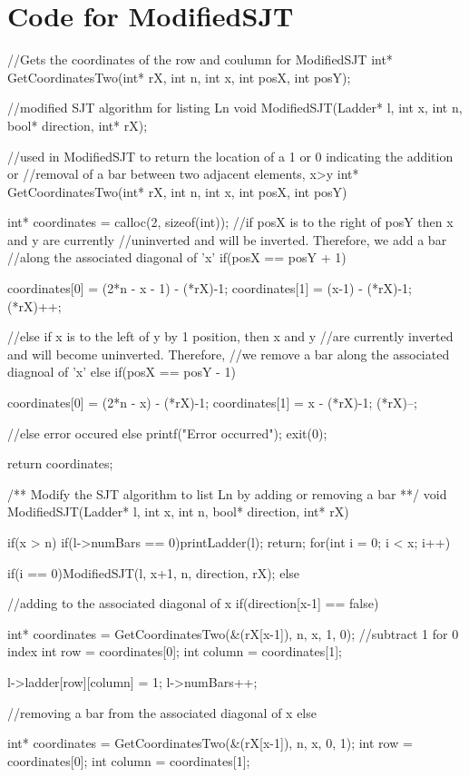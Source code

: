 \section{Code for {\sc ModifiedSJT}}

\begin{singlespace}
\begin{footnotesize}
\begin{code}
//Gets the coordinates of the row and coulumn for ModifiedSJT
int* GetCoordinatesTwo(int* rX, int n, int x, int posX, int posY);


//modified SJT algorithm for listing Ln
void ModifiedSJT(Ladder* l, int x, int n, bool* direction, int* rX);

//used in ModifiedSJT to return the location of a 1 or 0 indicating the addition or 
//removal of a bar between two adjacent elements, x>y
int* GetCoordinatesTwo(int* rX, int n, int x, int posX, int posY)
{
	int* coordinates = calloc(2, sizeof(int));
	//if posX is to the right of posY then x and y are currently 
	//uninverted and will be inverted. Therefore, we add a bar 
	//along the associated diagonal of 'x'
	if(posX == posY + 1)
	{
		coordinates[0] = (2*n - x - 1) - (*rX)-1;
		coordinates[1] = (x-1) - (*rX)-1;
		(*rX)++;

	}
	//else if x is to the left of y by 1 position, then x and y 
	//are currently inverted and will become uninverted. Therefore, 
	//we remove a bar along the associated diagnoal of 'x'
	else if(posX == posY - 1)
	{

		coordinates[0] = (2*n - x) - (*rX)-1;
		coordinates[1] = x - (*rX)-1;
		(*rX)--;

	}
	//else error occured
	else 
	{
		printf("Error occurred\n");
		exit(0);
	}

	return coordinates;
}

/** 
Modify the SJT algorithm to list Ln by adding or removing a bar
**/
void ModifiedSJT(Ladder* l, int x, int n, bool* direction, int* rX)
{
	if(x > n)
	{
		if(l->numBars == 0)printLadder(l);
		return;
	}
	for(int i = 0; i < x; i++)
	{
		if(i == 0)ModifiedSJT(l, x+1, n, direction, rX);
		else 
		{
			//adding to the associated diagonal of x
			if(direction[x-1] == false)
			{
				int* coordinates = GetCoordinatesTwo(&(rX[x-1]), n, x, 1, 0);
				//subtract 1 for 0 index
				int row = coordinates[0];
				int column = coordinates[1];

				l->ladder[row][column] = 1;
				l->numBars++;

			}
			//removing a bar from the associated diagonal of x
			else{
				int* coordinates = GetCoordinatesTwo(&(rX[x-1]), n, x, 0, 1);
				int row = coordinates[0];
				int column = coordinates[1];


}}}}
\end{code}
\end{footnotesize}
\end{singlespace}
